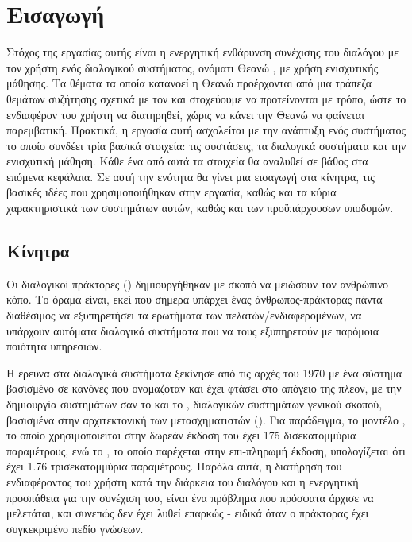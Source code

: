 \chapter{Εισαγωγή}


Στόχος της εργασίας αυτής είναι η ενεργητική ενθάρυνση συνέχισης του διαλόγου με τον χρήστη ενός διαλογικού συστήματος,
ονόματι Θεανώ \cite{ventoura-etal-2021-theano}, με χρήση ενισχυτικής μάθησης.
Τα θέματα τα οποία κατανοεί η Θεανώ προέρχονται από μια τράπεζα θεμάτων συζήτησης σχετικά με τον 
και στοχεύουμε να προτείνονται με τρόπο, ώστε το ενδιαφέρον του χρήστη να διατηρηθεί, χώρις να κάνει την Θεανώ να φαίνεται παρεμβατική.
Πρακτικά, η εργασία αυτή ασχολείται με την ανάπτυξη ενός συστήματος το οποίο συνδέει τρία βασικά στοιχεία:
τις συστάσεις, τα διαλογικά συστήματα και την ενισχυτική μάθηση. Κάθε ένα από αυτά τα στοιχεία θα αναλυθεί σε βάθος στα επόμενα κεφάλαια.
Σε αυτή την ενότητα θα γίνει μια εισαγωγή στα κίνητρα, τις βασικές ιδέες που χρησιμοποιήθηκαν στην εργασία,
καθώς και τα κύρια χαρακτηριστικά των συστημάτων αυτών, καθώς και των προϋπάρχουσων υποδομών.


\section{Κίνητρα}

Οι διαλογικοί πράκτορες () δημιουργήθηκαν με σκοπό να μειώσουν τον ανθρώπινο κόπο.
Το όραμα είναι, εκεί που σήμερα υπάρχει ένας άνθρωπος-πράκτορας πάντα διαθέσιμος να εξυπηρετήσει τα ερωτήματα των πελατών/ενδιαφερομένων,
να υπάρχουν αυτόματα διαλογικά συστήματα που να τους εξυπηρετούν με παρόμοια ποιότητα υπηρεσιών.

Η έρευνα στα διαλογικά συστήματα ξεκίνησε από τις αρχές του 1970 με ένα σύστημα βασισμένο σε κανόνες που ονομαζόταν \cite{eliza}
και έχει φτάσει στο απόγειο της πλεον, με την δημιουργία συστημάτων σαν το  και το , διαλογικών συστημάτων γενικού σκοπού,
βασισμένα στην αρχιτεκτονική των μετασχηματιστών ().
Για παράδειγμα, το μοντέλο , το οποίο χρησιμοποιείται στην δωρεάν έκδοση του  έχει 175 δισεκατομμύρια παραμέτρους\cite{brown2020language},
ενώ το , το οποίο παρέχεται στην επι-πληρωμή έκδοση, υπολογίζεται ότι έχει 1.76 τρισεκατομμύρια παραμέτρους. Παρόλα αυτά, η διατήρηση του ενδιαφέροντος
του χρήστη κατά την διάρκεια του διαλόγου και η ενεργητική προσπάθεια για την συνέχιση του, είναι ένα πρόβλημα που πρόσφατα άρχισε να μελετάται, και συνεπώς δεν έχει
λυθεί επαρκώς - ειδικά όταν ο πράκτορας έχει συγκεκριμένο πεδίο γνώσεων.

